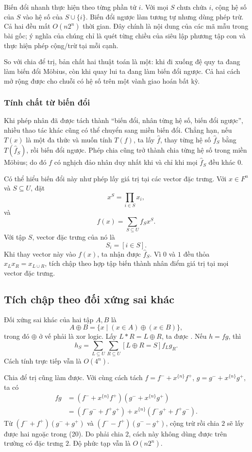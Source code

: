 \documentclass[11pt]{article}
\begin{document}
Biến đổi nhanh thực hiện theo từng phần tử \(i\). Với mọi \(S\) chưa chứa
\(i\), cộng hệ số của \(S\) vào hệ số của \(S\cup\{i\}\). Biến đổi ngược làm
tương tự nhưng dùng phép trừ. Cả hai đều mất \(O(n2^n)\) thời gian. Đây chính
là nội dung của các mã mẫu trong bài gốc; ý nghĩa của chúng chỉ là quét từng
chiều của siêu lập phương tập con và thực hiện phép cộng/trừ tại mỗi cạnh.

So với chia để trị, bản chất hai thuật toán là một: khi đi xuống đệ quy ta đang
làm biến đổi Möbius, còn khi quay lui ta đang làm biến đổi ngược. Cả hai cách
mở rộng được cho chuỗi có hệ số trên một vành giao hoán bất kỳ.

\subsubsection{Tính chất từ biến đổi}

Khi phép nhân đã được tách thành ``biến đổi, nhân từng hệ số, biến đổi ngược'',
nhiều thao tác khác cũng có thể chuyển sang miền biến đổi. Chẳng hạn, nếu
\(T(x)\) là một đa thức và muốn tính \(T(f)\), ta lấy \(\hat f\), thay từng hệ
số \(\hat f_S\) bằng \(T(\hat f_S)\), rồi biến đổi ngược. Phép chia cũng trở
thành chia từng hệ số trong miền Möbius; do đó \(f\) có nghịch đảo nhân duy
nhất khi và chỉ khi mọi \(\hat f_S\) đều khác \(0\).

Có thể hiểu biến đổi này như phép lấy giá trị tại các vector đặc trưng. Với
\(x\in F^n\) và \(S\subseteq U\), đặt
\[
  x^S=\prod_{i\in S}x_i, \tag{14}
\]
và
\[
  f(x)=\sum_{S\subseteq U} f_Sx^S. \tag{15}
\]
Với tập \(S\), vector đặc trưng của nó là
\[
  S_i=[i\in S]. \tag{16}
\]
Khi thay vector này vào \(f(x)\), ta nhận được \(\hat f_S\). Vì \(0\) và \(1\)
đều thỏa \(x_Lx_R=x_{L\cup R}\), tích chập theo hợp tập biến thành nhân điểm
giá trị tại mọi vector đặc trưng.

\subsection{Tích chập theo đối xứng sai khác}

Đối xứng sai khác của hai tập \(A,B\) là
\[
  A\oplus B=\{x\mid (x\in A)\oplus(x\in B)\}, \tag{17}
\]
trong đó \(\oplus\) ở vế phải là xor logic. Lấy \(L*R=L\oplus R\), ta được
. Nếu \(h=fg\), thì
\[
  h_S=\sum_{L\subseteq U}\sum_{R\subseteq U}
       [L\oplus R=S] f_Lg_R. \tag{18}
\]
Cách tính trực tiếp vẫn là \(O(4^n)\).

Chia để trị cũng làm được. Với cùng cách tách \(f=f^-+x^{\{n\}}f^+\),
\(g=g^-+x^{\{n\}}g^+\), ta có
\begin{align*}
  fg
  &= (f^-+x^{\{n\}}f^+)(g^-+x^{\{n\}}g^+) \tag{19}\\
  &= (f^-g^-+f^+g^+)+x^{\{n\}}(f^-g^+ + f^+g^-). \tag{20}
\end{align*}
Từ \((f^-+f^+)(g^-+g^+)\) và \((f^--f^+)(g^--g^+)\), cộng trừ rồi chia \(2\)
sẽ lấy được hai ngoặc trong (20). Do phải chia \(2\), cách này không dùng được
trên trường có đặc trưng \(2\). Độ phức tạp vẫn là \(O(n2^n)\).
\end{document}
